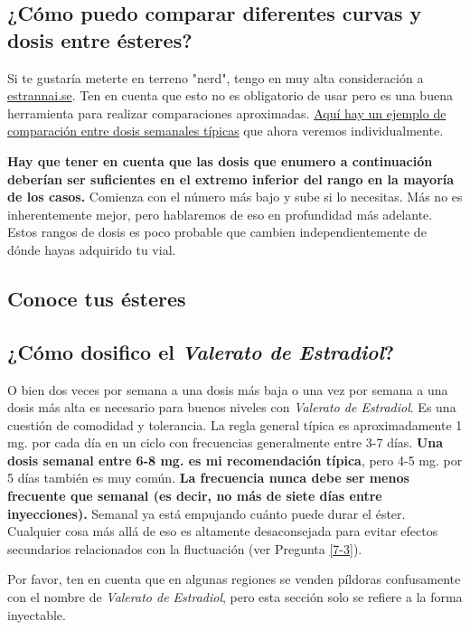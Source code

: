 \documentclass{article}
\begin{document}
\subsection{¿Cómo puedo comparar diferentes curvas y dosis entre ésteres?}

Si te gustaría meterte en terreno "nerd", tengo en muy alta consideración a \href{https://estrannai.se}{estrannai.se}. Ten en cuenta que esto no es obligatorio de usar pero es una buena herramienta para realizar comparaciones aproximadas. \href{https://estrannai.se/\#i0__cu,7,7,1-cu,5,7,3-cu,5,7,2}{Aquí hay un ejemplo de comparación entre dosis semanales típicas} que ahora veremos individualmente.

\textbf{Hay que tener en cuenta que las dosis que enumero a continuación deberían ser suficientes en el extremo inferior del rango en la mayoría de los casos.} Comienza con el número más bajo y sube si lo necesitas. Más no es inherentemente mejor, pero hablaremos de eso en profundidad más adelante. Estos rangos de dosis es poco probable que cambien independientemente de dónde hayas adquirido tu vial.

\subsection*{Conoce tus ésteres}

\subsection{¿Cómo dosifico el \textit{Valerato de Estradiol}?}

O bien dos veces por semana a una dosis más baja o una vez por semana a una dosis más alta es necesario para buenos niveles con \textit{Valerato de Estradiol}. Es una cuestión de comodidad y tolerancia. La regla general típica es aproximadamente 1 mg. por cada día en un ciclo con frecuencias generalmente entre 3-7 días. \textbf{Una dosis semanal entre 6-8 mg. es mi recomendación típica}, pero 4-5 mg. por 5 días también es muy común. \textbf{La frecuencia nunca debe ser menos frecuente que semanal (es decir, no más de siete días entre inyecciones).} Semanal ya está empujando cuánto puede durar el éster. Cualquier cosa más allá de eso es altamente desaconsejada para evitar efectos secundarios relacionados con la fluctuación (ver Pregunta \ref{7-3}).

Por favor, ten en cuenta que en algunas regiones se venden píldoras confusamente con el nombre de \textit{Valerato de Estradiol}, pero esta sección solo se refiere a la forma inyectable.
\end{document}
